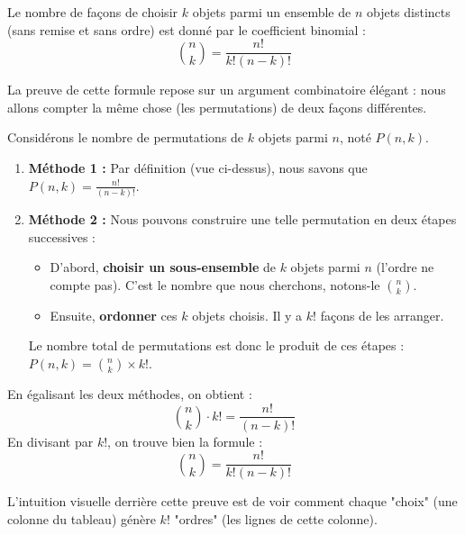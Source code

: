 \begin{theorembox}
Le nombre de façons de choisir $k$ objets parmi un ensemble de $n$ objets distincts (sans remise et sans ordre) est donné par le coefficient binomial :
$$ \binom{n}{k} = \frac{n!}{k!(n-k)!} $$
\end{theorembox}

La preuve de cette formule repose sur un argument combinatoire élégant : nous allons compter la même chose (les permutations) de deux façons différentes.

\newpage

\begin{proofbox}
Considérons le nombre de permutations de $k$ objets parmi $n$, noté $P(n,k)$.
\begin{enumerate}
    \item \textbf{Méthode 1 :} Par définition (vue ci-dessus), nous savons que $P(n,k) = \frac{n!}{(n-k)!}$.
    
    \item \textbf{Méthode 2 :} Nous pouvons construire une telle permutation en deux étapes successives :
    \begin{itemize}
        \item D'abord, \textbf{choisir un sous-ensemble} de $k$ objets parmi $n$ (l'ordre ne compte pas). C'est le nombre que nous cherchons, notons-le $\binom{n}{k}$.
        \item Ensuite, \textbf{ordonner} ces $k$ objets choisis. Il y a $k!$ façons de les arranger.
    \end{itemize}
    Le nombre total de permutations est donc le produit de ces étapes : $P(n,k) = \binom{n}{k} \times k!$.
\end{enumerate}
En égalisant les deux méthodes, on obtient :
\[ \binom{n}{k} \cdot k! = \frac{n!}{(n-k)!} \]
En divisant par $k!$, on trouve bien la formule :
\[ \binom{n}{k} = \frac{n!}{k!(n-k)!} \]
\end{proofbox}

L'intuition visuelle derrière cette preuve est de voir comment chaque "choix" (une colonne du tableau) génère $k!$ "ordres" (les lignes de cette colonne).

